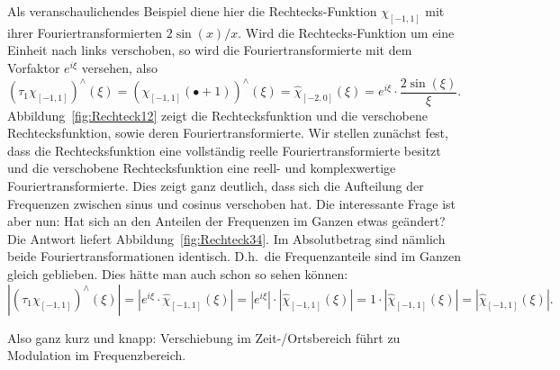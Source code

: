 \begin{remark}
\begin{enumerate}
		Als veranschaulichendes Beispiel diene hier die Rechtecks-Funktion $ \chi_{[-1,1]} $ mit
		ihrer Fouriertransformierten $ 2\sin(x) / x $. Wird die Rechtecks-Funktion um eine Einheit nach 
		links verschoben, so wird die Fouriertransformierte mit dem Vorfaktor $ e^{i\xi} $ versehen,
		also
		\[   (\tau_{1}\chi_{[-1,1]})^{\wedge}(\xi)
  		 = \left( \chi_{[-1,1]}(\bullet + 1) \right)^{\wedge}(\xi)
  		 = \widehat{\chi}_{[-2,0]}(\xi)
  		 = e^{i\xi} \cdot \frac{2 \sin(\xi)}{\xi}.
  	\]
  	Abbildung~\ref{fig:Rechteck12} zeigt die Rechtecksfunktion und die verschobene 
  	Rechtecksfunktion, sowie deren Fouriertransformierte. Wir stellen zunächst fest, dass die
  	Rechtecksfunktion eine vollständig reelle Fouriertransformierte besitzt und die verschobene
  	Rechtecksfunktion eine reell- und komplexwertige Fouriertransformierte. Dies zeigt ganz 
  	deutlich, dass sich die Aufteilung der Frequenzen zwischen sinus und cosinus verschoben hat. Die
  	interessante Frage ist aber nun: Hat sich an den Anteilen der Frequenzen im Ganzen etwas 
  	geändert? Die Antwort liefert Abbildung~\ref{fig:Rechteck34}. Im Absolutbetrag sind nämlich 
  	beide Fouriertransformationen identisch. D.h.\ die Frequenzanteile sind im Ganzen gleich
  	geblieben. Dies hätte man auch schon so sehen können:
  	\[
    	  \left| (\tau_{1}\chi_{[-1,1]})^{\wedge}(\xi) \right|
    	= \left| e^{i\xi} \cdot \widehat{\chi}_{[-1,1]}(\xi) \right|
    	= \left| e^{i\xi} \right| \cdot \left| \widehat{\chi}_{[-1,1]}(\xi) \right|
    	= 1 \cdot \left| \widehat{\chi}_{[-1,1]}(\xi) \right|
    	= \left| \widehat{\chi}_{[-1,1]}(\xi) \right|.
  	\]
  	
  	Also ganz kurz und knapp: Verschiebung im Zeit-/Ortsbereich führt zu Modulation im
  	Frequenzbereich.
  	

\end{enumerate}
\end{remark}
